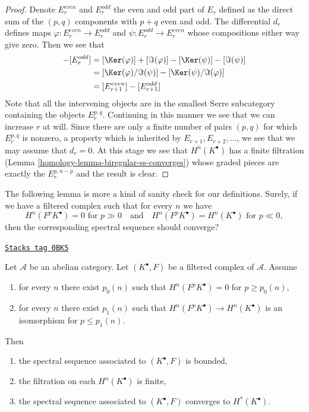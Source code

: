 \begin{proof}

Denote $E_r^{even}$ and $E_r^{odd}$ the even and odd part of $E_r$
defined as the direct sum of the $(p, q)$ components with $p + q$ even
and odd. The differential $d_r$ defines maps
$\varphi : E_r^{even} \to E_r^{odd}$ and $\psi : E_r^{odd} \to E_r^{even}$
whose compositions either way give zero.
Then we see that
\begin{align*}
[E_r^{even}] - [E_r^{odd}] & =
[\Ker(\varphi)] + [\Im(\varphi)] - [\Ker(\psi)] - [\Im(\psi)] \\
& =
[\Ker(\varphi)/\Im(\psi)] - [\Ker(\psi)/\Im(\varphi)] \\
& =
[E_{r + 1}^{even}] - [E_{r + 1}^{odd}]
\end{align*}
Note that all the intervening objects are in the smallest Serre
subcategory containing the objects $E_r^{p, q}$.
Continuing in this manner we see that we can increase $r$ at will.
Since there are only a finite number of pairs $(p, q)$ for which
$E_r^{p, q}$ is nonzero, a property which is inherited by
$E_{r + 1}, E_{r + 2}, \ldots$, we see that we may assume that $d_r = 0$.
At this stage we see that $H^n(K^\bullet)$ has a finite filtration
(Lemma \ref{homology-lemma-biregular-ss-converges}) whose graded pieces
are exactly the $E_r^{p, n - p}$ and the result is clear.
\end{proof}

The following lemma is more a kind of sanity check for our definitions.
Surely, if we have a filtered complex such that for every $n$ we have
$$
H^n(F^pK^\bullet) = 0\text{ for }p \gg 0
\quad\text{and}\quad
H^n(F^pK^\bullet) = H^n(K^\bullet)\text{ for }p \ll 0,
$$
then the corresponding spectral sequence should converge?

\begin{lemma}
\label{homology-lemma-ss-converges-trivial}
\href{https://stacks.math.columbia.edu/tag/0BK5}{\texttt{Stacks tag 0BK5}}

Let $\mathcal{A}$ be an abelian category. Let $(K^\bullet, F)$ be a
filtered complex of $\mathcal{A}$. Assume
\begin{enumerate}
\item for every $n$ there exist $p_0(n)$ such that
$H^n(F^pK^\bullet) = 0$ for $p \geq p_0(n)$,
\item for every $n$ there exist $p_1(n)$ such that
$H^n(F^pK^\bullet) \to H^n(K^\bullet)$ is an isomorphism
for $p \leq p_1(n)$.
\end{enumerate}
Then
\begin{enumerate}
\item the spectral sequence associated to $(K^\bullet, F)$ is bounded,
\item the filtration on each $H^n(K^\bullet)$ is finite,
\item the spectral sequence associated to $(K^\bullet, F)$ converges
to $H^*(K^\bullet)$.
\end{enumerate}
\end{lemma}

